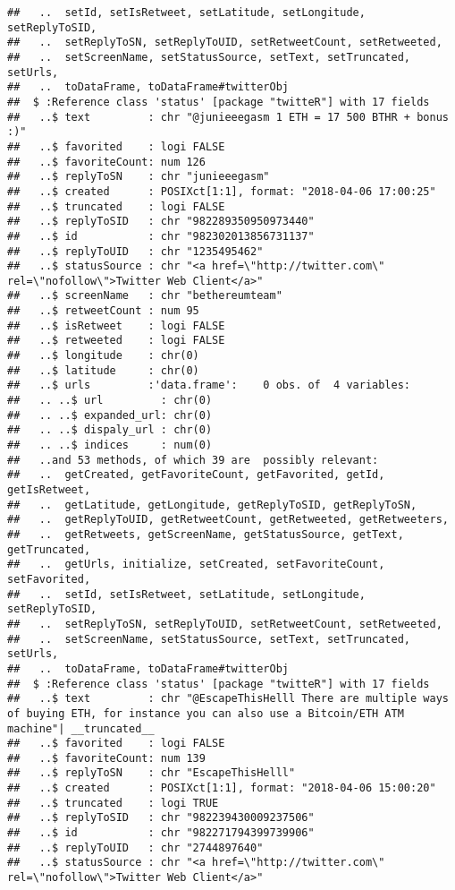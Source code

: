 \documentclass[]{article}
\begin{document}
\begin{verbatim}
##   ..  setId, setIsRetweet, setLatitude, setLongitude, setReplyToSID,
##   ..  setReplyToSN, setReplyToUID, setRetweetCount, setRetweeted,
##   ..  setScreenName, setStatusSource, setText, setTruncated, setUrls,
##   ..  toDataFrame, toDataFrame#twitterObj
##  $ :Reference class 'status' [package "twitteR"] with 17 fields
##   ..$ text         : chr "@junieeegasm 1 ETH = 17 500 BTHR + bonus :)"
##   ..$ favorited    : logi FALSE
##   ..$ favoriteCount: num 126
##   ..$ replyToSN    : chr "junieeegasm"
##   ..$ created      : POSIXct[1:1], format: "2018-04-06 17:00:25"
##   ..$ truncated    : logi FALSE
##   ..$ replyToSID   : chr "982289350950973440"
##   ..$ id           : chr "982302013856731137"
##   ..$ replyToUID   : chr "1235495462"
##   ..$ statusSource : chr "<a href=\"http://twitter.com\" rel=\"nofollow\">Twitter Web Client</a>"
##   ..$ screenName   : chr "bethereumteam"
##   ..$ retweetCount : num 95
##   ..$ isRetweet    : logi FALSE
##   ..$ retweeted    : logi FALSE
##   ..$ longitude    : chr(0) 
##   ..$ latitude     : chr(0) 
##   ..$ urls         :'data.frame':    0 obs. of  4 variables:
##   .. ..$ url         : chr(0) 
##   .. ..$ expanded_url: chr(0) 
##   .. ..$ dispaly_url : chr(0) 
##   .. ..$ indices     : num(0) 
##   ..and 53 methods, of which 39 are  possibly relevant:
##   ..  getCreated, getFavoriteCount, getFavorited, getId, getIsRetweet,
##   ..  getLatitude, getLongitude, getReplyToSID, getReplyToSN,
##   ..  getReplyToUID, getRetweetCount, getRetweeted, getRetweeters,
##   ..  getRetweets, getScreenName, getStatusSource, getText, getTruncated,
##   ..  getUrls, initialize, setCreated, setFavoriteCount, setFavorited,
##   ..  setId, setIsRetweet, setLatitude, setLongitude, setReplyToSID,
##   ..  setReplyToSN, setReplyToUID, setRetweetCount, setRetweeted,
##   ..  setScreenName, setStatusSource, setText, setTruncated, setUrls,
##   ..  toDataFrame, toDataFrame#twitterObj
##  $ :Reference class 'status' [package "twitteR"] with 17 fields
##   ..$ text         : chr "@EscapeThisHelll There are multiple ways of buying ETH, for instance you can also use a Bitcoin/ETH ATM machine"| __truncated__
##   ..$ favorited    : logi FALSE
##   ..$ favoriteCount: num 139
##   ..$ replyToSN    : chr "EscapeThisHelll"
##   ..$ created      : POSIXct[1:1], format: "2018-04-06 15:00:20"
##   ..$ truncated    : logi TRUE
##   ..$ replyToSID   : chr "982239430009237506"
##   ..$ id           : chr "982271794399739906"
##   ..$ replyToUID   : chr "2744897640"
##   ..$ statusSource : chr "<a href=\"http://twitter.com\" rel=\"nofollow\">Twitter Web Client</a>"

\end{verbatim}
\end{document}
